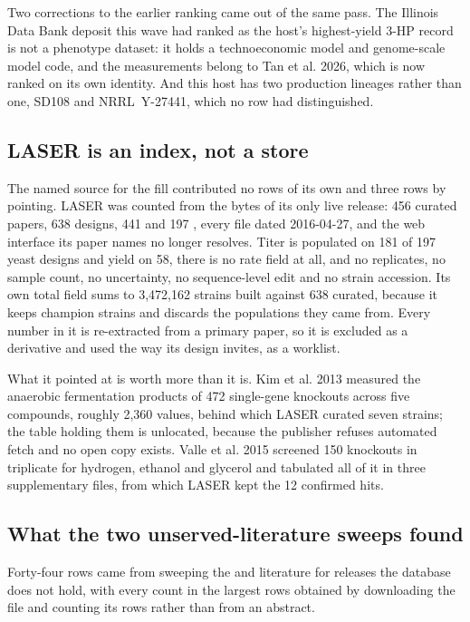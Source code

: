 Two corrections to the earlier ranking came out of the same pass. The Illinois Data Bank
deposit this wave had ranked as the host's highest-yield 3-HP record is not a phenotype dataset:
it holds a technoeconomic model and genome-scale model code, and the measurements belong to
Tan et al. 2026, which is now ranked on its own identity. And this host has two production
lineages rather than one, SD108 and NRRL~Y-27441, which no row had distinguished.

\subsection{LASER is an index, not a store}\label{sec:fill-laser}

The named source for the fill contributed no rows of its own and three rows by pointing. LASER
was counted from the bytes of its only live release: 456 curated papers, 638 designs, 441
 and 197 , every file dated 2016-04-27, and the web interface
its paper names no longer resolves. Titer is populated on 181 of 197 yeast designs and yield on
58, there is no rate field at all, and no replicates, no sample count, no uncertainty, no
sequence-level edit and no strain accession. Its own total field sums to 3,472,162 strains built
against 638 curated, because it keeps champion strains and discards the populations they came
from. Every number in it is re-extracted from a primary paper, so it is excluded as a derivative
and used the way its design invites, as a worklist.

What it pointed at is worth more than it is. Kim et al. 2013 measured the anaerobic fermentation
products of 472 single-gene knockouts across five compounds, roughly 2,360 values, behind which
LASER curated seven strains; the table holding them is unlocated, because the publisher refuses
automated fetch and no open copy exists. Valle et al. 2015 screened 150 knockouts in triplicate
for hydrogen, ethanol and glycerol and tabulated all of it in three supplementary files, from
which LASER kept the 12 confirmed hits.

\subsection{What the two unserved-literature sweeps found}\label{sec:fill-unserved}

Forty-four rows came from sweeping the  and  literature for
releases the database does not hold, with every count in the largest rows obtained by
downloading the file and counting its rows rather than from an abstract.

